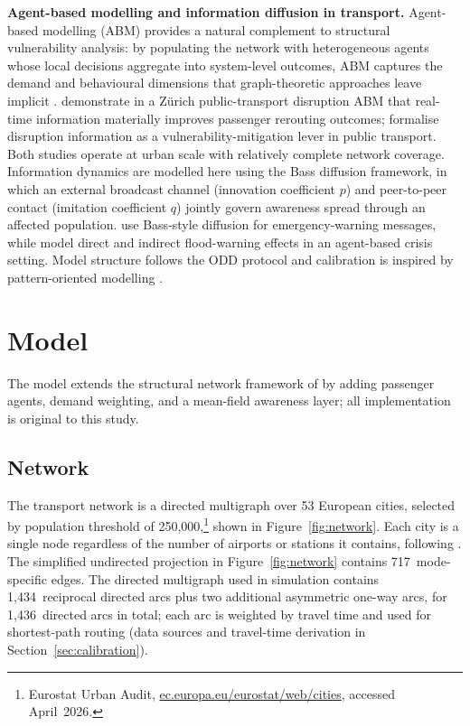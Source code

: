 \documentclass[12pt,a4paper]{article}
\begin{document}
\textbf{Agent-based modelling and information diffusion in transport.}
Agent-based modelling (ABM) provides a natural complement to structural vulnerability
analysis: by populating the network with heterogeneous agents whose local decisions
aggregate into system-level outcomes, ABM captures the demand and behavioural dimensions
that graph-theoretic approaches leave implicit \citep{Epstein1996}.
\citet{Leng2020} demonstrate in a Z\"{u}rich public-transport disruption ABM that real-time information
materially improves passenger rerouting outcomes; \citet{Cats2014} formalise disruption
information as a vulnerability-mitigation lever in public transport.
Both studies operate at urban scale with relatively complete network coverage.
Information dynamics are modelled here using the Bass \citeyearpar{Bass1969} diffusion
framework, in which an external broadcast channel (innovation coefficient $p$) and
peer-to-peer contact (imitation coefficient $q$) jointly govern awareness spread through
an affected population.
\citet{DArienzo2020} use Bass-style diffusion for emergency-warning messages, while \citet{OShea2020} model direct and indirect flood-warning effects in an agent-based crisis setting.
Model structure follows the ODD protocol \citep{Grimm2020} and calibration is inspired by pattern-oriented modelling \citep{Grimm2005}.

\section{Model}
\label{sec:model}

The model extends the structural network framework of \citet{Ippolito2024}
by adding passenger agents, demand weighting, and a mean-field awareness layer;
all implementation is original to this study.

\subsection{Network}

The transport network is a directed multigraph over 53 European cities, selected by
population threshold of 250,000,\footnote{Eurostat Urban Audit, \href{https://ec.europa.eu/eurostat/web/cities/data/database}{ec.europa.eu/eurostat/web/cities}, accessed April~2026.} shown in Figure~\ref{fig:network}.
Each city is a single node regardless of the number of airports or stations it contains,
following \citet{Ippolito2024}.
The simplified undirected projection in Figure~\ref{fig:network} contains 717~mode-specific edges.
The directed multigraph used in simulation contains 1,434~reciprocal directed arcs plus two additional
asymmetric one-way arcs, for 1,436~directed arcs in total; each arc is weighted by travel time and used for shortest-path routing
(data sources and travel-time derivation in Section~\ref{sec:calibration}).
\end{document}

